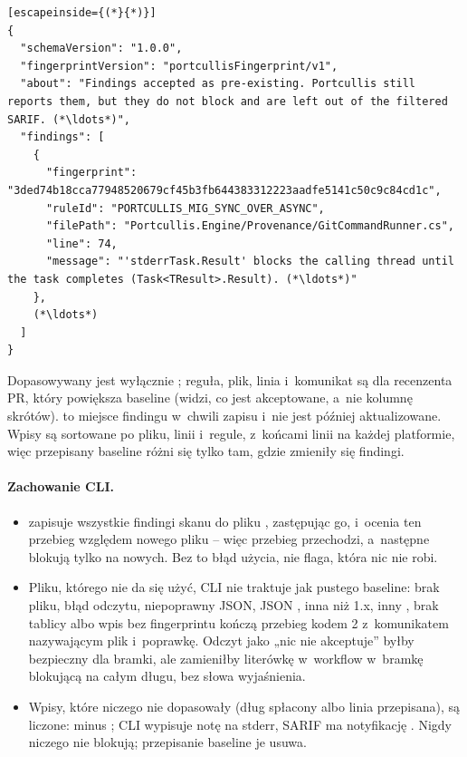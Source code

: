 \begin{lstlisting}[escapeinside={(*}{*)}]
{
  "schemaVersion": "1.0.0",
  "fingerprintVersion": "portcullisFingerprint/v1",
  "about": "Findings accepted as pre-existing. Portcullis still reports them, but they do not block and are left out of the filtered SARIF. (*\ldots*)",
  "findings": [
    {
      "fingerprint": "3ded74b18cca77948520679cf45b3fb644383312223aadfe5141c50c9c84cd1c",
      "ruleId": "PORTCULLIS_MIG_SYNC_OVER_ASYNC",
      "filePath": "Portcullis.Engine/Provenance/GitCommandRunner.cs",
      "line": 74,
      "message": "'stderrTask.Result' blocks the calling thread until the task completes (Task<TResult>.Result). (*\ldots*)"
    },
    (*\ldots*)
  ]
}
\end{lstlisting}

Dopasowywany jest wyłącznie ; reguła, plik, linia i~komunikat są dla
recenzenta PR, który powiększa baseline (widzi, co jest akceptowane, a~nie kolumnę
skrótów).  to miejsce findingu w~chwili zapisu i~nie jest później
aktualizowane. Wpisy są sortowane po pliku, linii i~regule, z~końcami linii 
na każdej platformie, więc przepisany baseline różni się tylko tam, gdzie zmieniły się
findingi.

\paragraph{Zachowanie CLI.}
\begin{itemize}[leftmargin=*]
  \item {} zapisuje wszystkie findingi skanu do pliku
        , zastępując go, i~ocenia ten przebieg względem nowego pliku --
        więc przebieg przechodzi, a~następne blokują tylko na nowych. Bez
         to błąd użycia, nie flaga, która nic nie robi.
  \item Pliku, którego nie da się użyć, CLI nie traktuje jak pustego baseline: brak pliku,
        błąd odczytu, niepoprawny JSON, JSON , 
        inna niż 1.x, inny , brak tablicy
         albo wpis bez fingerprintu kończą przebieg kodem 2
        z~komunikatem nazywającym plik i~poprawkę. Odczyt jako „nic nie akceptuje” byłby
        bezpieczny dla bramki, ale zamieniłby literówkę w~workflow w~bramkę blokującą na
        całym długu, bez słowa wyjaśnienia.
  \item Wpisy, które niczego nie dopasowały (dług spłacony albo linia przepisana), są
        liczone:  minus ;
        CLI wypisuje notę na stderr, SARIF ma notyfikację . Nigdy niczego nie
        blokują; przepisanie baseline je usuwa.
\end{itemize}

